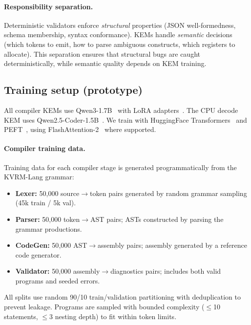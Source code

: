 \documentclass[11pt]{article}
\begin{document}
\paragraph{Responsibility separation.}
Deterministic validators enforce \emph{structural} properties (JSON well-formedness, schema membership, syntax conformance). KEMs handle \emph{semantic} decisions (which tokens to emit, how to parse ambiguous constructs, which registers to allocate). This separation ensures that structural bugs are caught deterministically, while semantic quality depends on KEM training.

\subsection{Training setup (prototype)}
All compiler KEMs use Qwen3-1.7B~\cite{qwen3} with LoRA adapters~\cite{hu2022lora}.
The CPU decode KEM uses Qwen2.5-Coder-1.5B~\cite{qwen25coder}.
We train with HuggingFace Transformers~\cite{wolf2020transformers} and PEFT~\cite{peft}, using FlashAttention-2~\cite{dao2023flashattn2} where supported.

\paragraph{Compiler training data.}
Training data for each compiler stage is generated programmatically from the KVRM-Lang grammar:
\begin{itemize}[leftmargin=*]
  \item \textbf{Lexer:} 50{,}000 source$\rightarrow$token pairs generated by random grammar sampling (45k train / 5k val).
  \item \textbf{Parser:} 50{,}000 token$\rightarrow$AST pairs; ASTs constructed by parsing the grammar productions.
  \item \textbf{CodeGen:} 50{,}000 AST$\rightarrow$assembly pairs; assembly generated by a reference code generator.
  \item \textbf{Validator:} 50{,}000 assembly$\rightarrow$diagnostics pairs; includes both valid programs and seeded errors.
\end{itemize}
All splits use random 90/10 train/validation partitioning with deduplication to prevent leakage. Programs are sampled with bounded complexity ($\leq$10 statements, $\leq$3 nesting depth) to fit within token limits.
\end{document}
